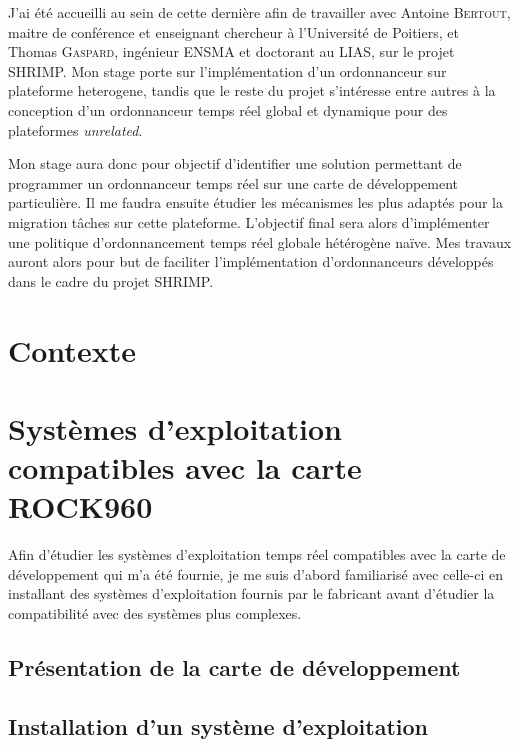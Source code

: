 \documentclass[11pt]{article}
\begin{document}
    J'ai été accueilli au sein de cette dernière afin de travailler avec Antoine \textsc{Bertout}, maitre de conférence et enseignant chercheur à l'Université de Poitiers, et Thomas \textsc{Gaspard}, ingénieur ENSMA et doctorant au LIAS, sur le projet \gls{SHRIMP}. Mon stage porte sur l'implémentation d'un \gls{ordonnanceur} sur \gls{plateforme heterogene}\cite{bertout2020workload}, tandis que le reste du projet s'intéresse entre autres à la conception d'un \gls{ordonnanceur} temps réel global et dynamique pour des plateformes \textit{unrelated}.

    Mon stage aura donc pour objectif d'identifier une solution permettant de programmer un \gls{ordonnanceur} temps réel sur une carte de développement particulière. Il me faudra ensuite étudier les mécanismes les plus adaptés pour la migration tâches sur cette plateforme. L'objectif final sera alors d'implémenter une politique d'\gls{ordonnancement} temps réel globale hétérogène naïve. Mes travaux auront alors pour but de faciliter l'implémentation d'ordonnanceurs développés dans le cadre du projet SHRIMP.
    
    \newpage
    \section{Contexte}
    
    


    \newpage
    
    \section[OS compatibles avec la carte]{Systèmes d'exploitation compatibles avec la carte ROCK960}

    Afin d'étudier les systèmes d'exploitation temps réel compatibles avec la carte de développement qui m'a été fournie, je me suis d'abord familiarisé avec celle-ci en installant des systèmes d'exploitation fournis par le fabricant avant d'étudier la compatibilité avec des systèmes plus complexes.

    
    \subsection{Présentation de la carte de développement}
    

    \subsection{Installation d'un système d'exploitation}
    
\end{document}
